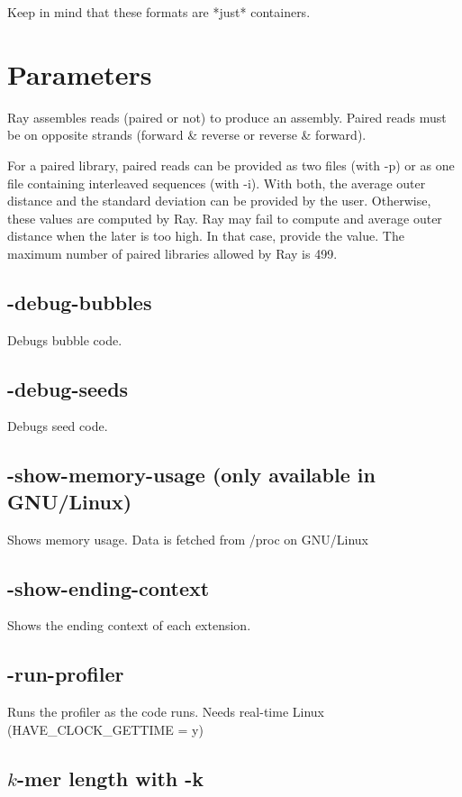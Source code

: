 \documentclass{article}
\begin{document}
Keep in mind that these formats are *just* containers.


\section{Parameters}

Ray assembles reads (paired or not) to produce an assembly.
Paired reads must be on opposite strands (forward \& reverse or reverse \& forward).

For a paired library, paired reads can be provided as two files (with -p) or as one file containing interleaved
sequences (with -i).
With both, the average outer distance and the standard deviation can be provided by the user. Otherwise, these values are
computed by Ray. Ray may fail to compute and average outer distance when the later is too high.
In that case, provide the value.
The maximum  number of paired libraries allowed by Ray is 499.

\subsection{      
 -debug-bubbles
}
              Debugs bubble code.

\subsection{      
       -debug-seeds
}
              Debugs seed code.

\subsection{      
       -show-memory-usage (only available in GNU/Linux)
}
              Shows memory usage. Data is fetched from /proc on GNU/Linux

\subsection{      
       -show-ending-context
}
              Shows the ending context of each extension.

\subsection{      
       -run-profiler
}
              Runs the profiler as the code runs. Needs real-time Linux (HAVE\_CLOCK\_GETTIME = y)


\subsection{$k$-mer length with -k}
\end{document}
